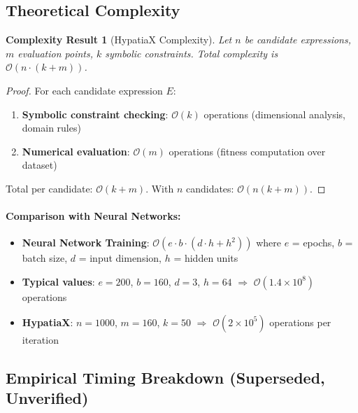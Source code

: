\documentclass[twoside,11pt]{article}
\newtheorem{complexity}{Complexity Result}
\providecommand{\qed}{\hfill\BlackBox}
\begin{document}
\subsection{Theoretical Complexity}

\begin{complexity}[HypatiaX Complexity]
Let $n$ be candidate expressions, $m$ evaluation points, $k$ symbolic constraints. Total complexity is $\mathcal{O}(n \cdot (k + m))$.
\end{complexity}

\begin{proof}
For each candidate expression $E$:
\begin{enumerate}
\item \textbf{Symbolic constraint checking}: $\mathcal{O}(k)$ operations (dimensional analysis, domain rules)
\item \textbf{Numerical evaluation}: $\mathcal{O}(m)$ operations (fitness computation over dataset)
\end{enumerate}

Total per candidate: $\mathcal{O}(k + m)$. With $n$ candidates: $\mathcal{O}(n(k + m))$. \qed
\end{proof}

\paragraph{Comparison with Neural Networks:}
\begin{itemize}
\item \textbf{Neural Network Training}: $\mathcal{O}(e \cdot b \cdot (d \cdot h + h^2))$ where $e$ = epochs, $b$ = batch size, $d$ = input dimension, $h$ = hidden units
\item \textbf{Typical values}: $e=200$, $b=160$, $d=3$, $h=64$ $\Rightarrow$ $\mathcal{O}(1.4 \times 10^8)$ operations
\item \textbf{HypatiaX}: $n=1000$, $m=160$, $k=50$ $\Rightarrow$ $\mathcal{O}(2 \times 10^5)$ operations per iteration
\end{itemize}

\subsection{Empirical Timing Breakdown (Superseded, Unverified)}
\end{document}

